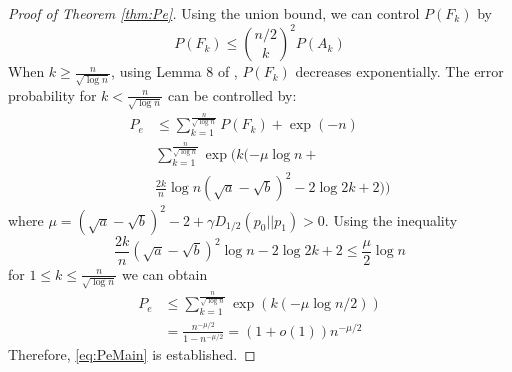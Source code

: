 \documentclass[conference]{IEEEtran}
\begin{document}
\begin{proof}[Proof of Theorem \ref{thm:Pe}]
		Using the union bound, we can control $P(F_k)$ by
		$$
		P(F_k) \leq \binom{n/2}{k}^2 P(A_k)
		$$
		When $k \geq \frac{n}{\sqrt{\log n}}$, using Lemma 8 of \cite{feng2021},
		$P(F_k)$ decreases exponentially. The error probability for $k < \frac{n}{\sqrt{\log n}}$
		can be controlled by:
		\begin{align*}
		P_e &\leq \sum_{k=1}^{\frac{n}{\sqrt{\log n}}} P(F_k) + \exp(-n) \\
		& \sum_{k=1}^{\frac{n}{\sqrt{\log n}}} \exp(k(-\mu \log n + \\
		&\frac{2k}{n} \log n(\sqrt{a} - \sqrt{b})^2 - 2\log 2k + 2))
		\end{align*}
		where $\mu = (\sqrt{a} - \sqrt{b})^2-2 + \gamma D_{1/2}(p_0||p_1) > 0$.
		Using the inequality
		$$
		\frac{2k}{n}(\sqrt{a} - \sqrt{b})^2\log n -2\log2k+2\leq \frac{\mu}{2} \log n
		$$
		for $1\leq k \leq \frac{n}{\sqrt{\log n}}$ we can obtain
		\begin{align*}
		P_e &\leq \sum_{k=1}^{\frac{n}{\sqrt{\log n}}} \exp(k(-\mu \log n/2)) \\
		& = \frac{n^{-\mu / 2}}{1-n^{-\mu / 2}} = (1+o(1))n^{-\mu / 2}
		\end{align*}
		Therefore, \eqref{eq:PeMain} is established.
	\end{proof}
\end{document}
